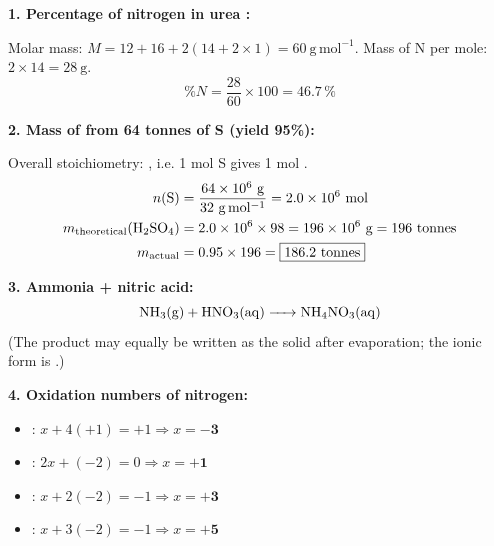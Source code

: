 \documentclass[11pt]{article}
\begin{document}
\begin{corrige}
\textbf{1. Percentage of nitrogen in urea :}

Molar mass: $M = 12 + 16 + 2(14 + 2\times 1) = 60\ \mathrm{g\,mol^{-1}}$.
Mass of N per mole: $2 \times 14 = 28\ \mathrm{g}$.
\[ \%N = \frac{28}{60}\times 100 = \boxed{46.7\,\%} \]

\textbf{2. Mass of  from 64 tonnes of S (yield 95\%):}

Overall stoichiometry: , i.e. 1 mol S gives 1 mol .
\begin{align*}
n(\ce{S}) &= \frac{64\times 10^{6}\ \mathrm{g}}{32\ \mathrm{g\,mol^{-1}}} = 2.0\times 10^{6}\ \mathrm{mol}\\
m_{\text{theoretical}}(\ce{H2SO4}) &= 2.0\times 10^{6} \times 98 = 196\times 10^{6}\ \mathrm{g} = 196\ \text{tonnes}\\
m_{\text{actual}} &= 0.95 \times 196 = \boxed{186.2\ \text{tonnes}}
\end{align*}

\textbf{3. Ammonia + nitric acid:}
\[ \ce{NH3(g) + HNO3(aq) -> NH4NO3(aq)} \]
(The product may equally be written as the solid  after evaporation; the ionic form is .)

\textbf{4. Oxidation numbers of nitrogen:}
\begin{itemize}
\item {}: $x + 4(+1) = +1 \Rightarrow x = \mathbf{-3}$
\item {}: $2x + (-2) = 0 \Rightarrow x = \mathbf{+1}$
\item {}: $x + 2(-2) = -1 \Rightarrow x = \mathbf{+3}$
\item {}: $x + 3(-2) = -1 \Rightarrow x = \mathbf{+5}$
\end{itemize}
\end{corrige}
\end{document}
